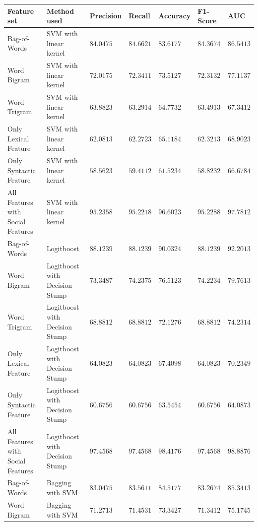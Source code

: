 \begin{table}[htb]
  \centering
  {\small
  \begin{tabular}{|@{~}l@{~~}|@{~~}l@{~}|@{~~}l@{~}|@{~~}l@{~}|@{~~}l@{~}|@{~~}l@{~}|@{~~}l@{~}|}
\hline
Feature set & Method used & Precision & Recall & Accuracy & F1-Score & AUC \\\hline
Bag-of-Words & SVM with linear kernel & $84.0475$ & $84.6621$ & $83.6177$ & $84.3674$ & $86.5413$ \\\hline
Word Bigram & SVM with linear kernel & $72.0175$ & $72.3411$ & $73.5127$ & $72.3132$ & $77.1137$  \\\hline
Word Trigram & SVM with linear kernel & $63.8823$ & $63.2914$ & $64.7732$ & $63.4913$  & $67.3412$  \\\hline
Only Lexical Feature & SVM with linear kernel & $62.0813$ & $62.2723$ & $65.1184$ & $62.3213$   & $68.9023$ \\\hline
Only Syntactic Feature & SVM with linear kernel & $58.5623$ & $59.4112$ & $61.5234$ & $58.8232$  & $66.6784$ \\\hline
All Features with Social Features & SVM with linear kernel & $\mathbf{95.2358}$ & $\mathbf{95.2218}$ & $\mathbf{96.6023}$ & $\mathbf{95.2288}$   & $\mathbf{97.7812}$ \\\hline
Bag-of-Words & Logitboost & $88.1239$ & $88.1239$ & $90.0324$ & $88.1239$  & $92.2013$  \\\hline
Word Bigram & Logitboost with Decision Stump & $73.3487$ & $74.2375$ & $76.5123$ & $74.2234$   & $79.7613$ \\\hline
Word Trigram & Logitboost with Decision Stump & $68.8812$ & $68.8812$ & $72.1276$ & $68.8812$   & $74.2314$ \\\hline
Only Lexical Feature & Logitboost with Decision Stump & $64.0823$ & $64.0823$ & $67.4098$ & $64.0823$  & $70.2349$  \\\hline
Only Syntactic Feature & Logitboost with Decision Stump & $60.6756$ & $60.6756$ & $63.5454$ & $60.6756$  & $64.0873$ \\\hline
All Features with Social Features & Logitboost with Decision Stump & $\mathbf{97.4568}$ & $\mathbf{97.4568}$ & $\mathbf{98.4176}$ & $\mathbf{97.4568}$ & $\mathbf{98.8876}$ \\\hline
Bag-of-Words & Bagging with SVM & $83.0475$ & $83.5611$ & $84.5177$ & $83.2674$ & $85.3413$ \\\hline
Word Bigram & Bagging with SVM & $71.2713$ & $71.4531$ & $73.3427$ & $71.3412$  & $75.1745$ \\\hline

\end{tabular}}
\end{table}
